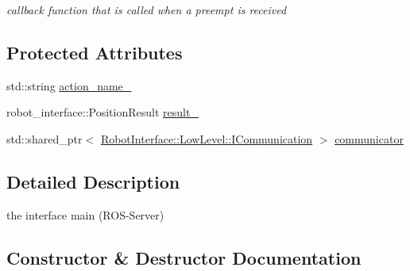 \begin{DoxyCompactItemize}
\begin{DoxyCompactList}\small\item\em callback function that is called when a preempt is received \end{DoxyCompactList}\end{DoxyCompactItemize}
\subsection*{Protected Attributes}
\begin{DoxyCompactItemize}
\item 
std\+::string \hyperlink{classRobotInterface_1_1HighLevel_1_1PositionAction_af72be4d4f22d1beec53f70c8b56d714c}{action\+\_\+name\+\_\+}
\item 
robot\+\_\+interface\+::\+Position\+Result \hyperlink{classRobotInterface_1_1HighLevel_1_1PositionAction_af6ed333fa76b5f122640358b3d84b3cc}{result\+\_\+}
\item 
std\+::shared\+\_\+ptr$<$ \hyperlink{classRobotInterface_1_1LowLevel_1_1ICommunication}{Robot\+Interface\+::\+Low\+Level\+::\+I\+Communication} $>$ \hyperlink{classRobotInterface_1_1HighLevel_1_1PositionAction_a0b8e6a4a7f889214b4e4b69f566268c6}{communicator}
\end{DoxyCompactItemize}


\subsection{Detailed Description}
the interface \textquotesingle{}main\textquotesingle{} (R\+O\+S-\/\+Server) 

\subsection{Constructor \& Destructor Documentation}
